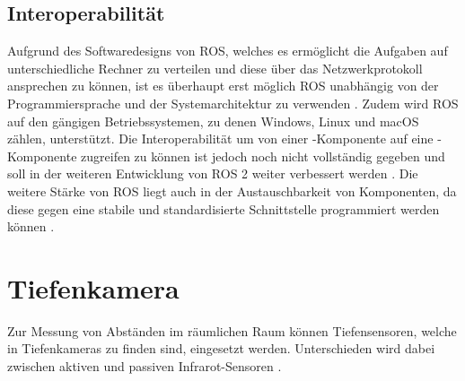 \subsection{Interoperabilität}
Aufgrund des Softwaredesigns von ROS, welches es ermöglicht die Aufgaben auf unterschiedliche Rechner zu verteilen und diese über das Netzwerkprotokoll ansprechen zu können, ist es überhaupt erst möglich ROS unabhängig von der Programmiersprache und der Systemarchitektur zu verwenden \cite{noauthor_rosorg_is_ros_for_me_nodate}. Zudem wird ROS auf den gängigen Betriebssystemen, zu denen Windows, Linux und macOS zählen, unterstützt. Die Interoperabilität um von einer -Komponente auf eine -Komponente zugreifen zu können ist jedoch noch nicht vollständig gegeben und soll in der weiteren Entwicklung von ROS 2 weiter verbessert werden \cite{noauthor_ros_2_features_nodate}. Die weitere Stärke von ROS liegt auch in der Austauschbarkeit von Komponenten, da diese gegen eine stabile und standardisierte Schnittstelle programmiert werden können \cite{noauthor_roboter_schnittstellen_nodate}.

\section{Tiefenkamera}
Zur Messung von Abständen im räumlichen Raum können Tiefensensoren, welche in Tiefenkameras zu finden sind, eingesetzt werden. Unterschieden wird dabei zwischen aktiven und passiven Infrarot-Sensoren \cite{noauthor_understanding_infrared_sensors_nodate}.


